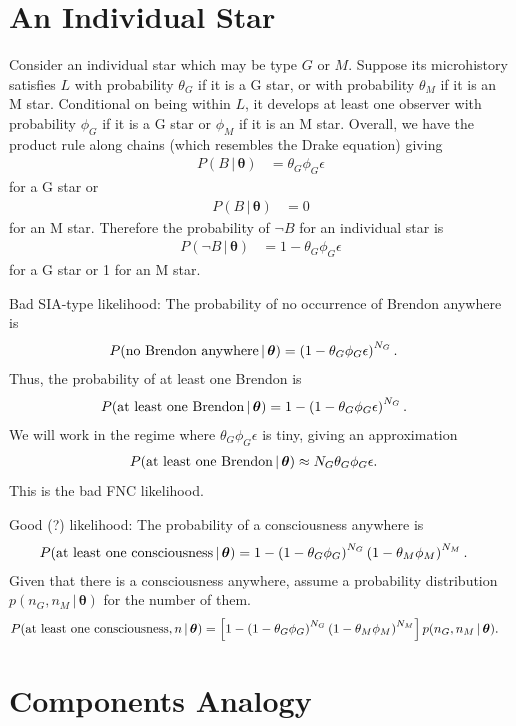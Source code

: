 \documentclass[a4paper, 12pt]{article}
\newcommand{\given}{\,|\,}
\begin{document}
\section*{An Individual Star}
Consider an individual star which may be type $G$ or $M$.
Suppose its microhistory satisfies $L$ with probability $\theta_G$ if it is
a G star, or with probability $\theta_M$ if it is an M star.
Conditional on being within $L$, it develops at least one observer with
probability $\phi_G$ if it is a G star or $\phi_M$ if it is an M star.
Overall, we have the product rule along chains (which resembles the Drake
equation) giving
\begin{align}
P(B \given \boldsymbol{\theta}) &= \theta_G \phi_G \epsilon
\end{align}
for a G star or
\begin{align}
P(B \given \boldsymbol{\theta}) &= 0
\end{align}
for an M star.
Therefore the probability of $\neg B$ for an individual star is
\begin{align}
P(\neg B \given \boldsymbol{\theta}) &= 1 - \theta_G \phi_G \epsilon
\end{align}
for a G star or 1 for an M star.

Bad SIA-type likelihood:
The probability of no occurrence of Brendon anywhere is
\begin{align}
P(\textnormal{no Brendon anywhere} \given \boldsymbol{\theta})
    &= \left(1 - \theta_G \phi_G \epsilon\right)^{N_G}.
\end{align}
Thus, the probability of at least one Brendon is
\begin{align}
P(\textnormal{at least one Brendon} \given \boldsymbol{\theta})
    &= 1 - \left(1 - \theta_G \phi_G \epsilon\right)^{N_G}.
\end{align}
We will work in the regime where $\theta_G\phi_G\epsilon$ is tiny,
giving an approximation
\begin{align}
P(\textnormal{at least one Brendon} \given \boldsymbol{\theta})
    &\approx N_G \theta_G \phi_G \epsilon.
\end{align}
This is the bad FNC likelihood.

Good (?) likelihood:
The probability of a consciousness anywhere is
\begin{align}
P(\textnormal{at least one consciousness} \given \boldsymbol{\theta})
    &= 1 - \left(1 - \theta_G \phi_G \right)^{N_G}
           \left(1 - \theta_M \phi_M \right)^{N_M}.
\end{align}
Given that there is a consciousness anywhere, assume a probability distribution
$p(n_G, n_M \given \boldsymbol{\theta})$ for the number of them.
\begin{align}
P(\textnormal{at least one consciousness}, n \given \boldsymbol{\theta})
    &= \left[1 - \left(1 - \theta_G \phi_G \right)^{N_G}
           \left(1 - \theta_M \phi_M \right)^{N_M}\right]p(n_G, n_M \given \boldsymbol{\theta}).
\end{align}


\section*{Components Analogy}
\end{document}
